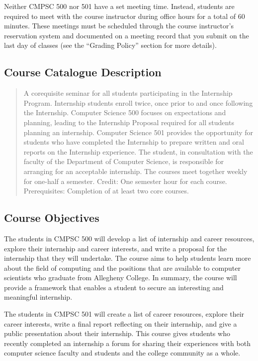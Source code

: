 Neither CMPSC 500 nor 501 have a set meeting time.  Instead, students are required to meet with the course instructor
during office hours for a total of 60 minutes.  These meetings must be scheduled through the course instructor's reservation
system and documented on a meeting record that you submit on the last day of classes (see the ``Grading Policy''
section for more details).

\subsection*{Course Catalogue Description}

\begin{quote}
A corequisite seminar for all students participating in the Internship Program.  Internship students enroll twice, once
prior to and once following the Internship. Computer Science 500 focuses on expectations and planning, leading to the
Internship Proposal required for all students planning an internship.  Computer Science 501 provides the opportunity for
students who have completed the Internship to prepare written and oral reports on the Internship experience. The
student, in consultation with the faculty of the Department of Computer Science, is responsible for arranging for an
acceptable internship.  The courses meet together weekly for one-half a semester. Credit: One semester hour for each
course. Prerequisites: Completion of at least two core courses.
\end{quote}

\subsection*{Course Objectives}

The students in CMPSC 500 will develop a list of internship and career resources, explore their internship and career
interests, and write a proposal for the internship that they will undertake. The course aims to help students learn more
about the field of computing and the positions that are available to computer scientists who graduate from Allegheny
College.  In summary, the course will provide a framework that enables a student to secure an interesting and meaningful
internship.

\noindent
The students in CMPSC 501 will create a list of career resources, explore their career interests, write a final report
reflecting on their internship, and give a public presentation about their internship.  This course gives
students who recently completed an internship a forum for sharing their experiences with both computer science faculty
and students and the college community as a whole.

